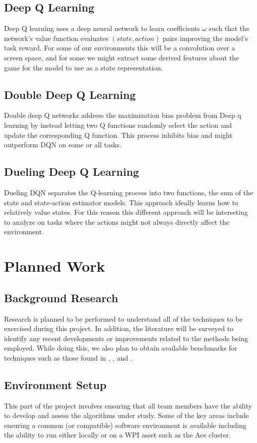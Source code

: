 \documentclass[conference]{IEEEtran}
\begin{document}
\subsection{Deep Q Learning}
Deep Q learning uses a deep neural network to learn coefficients $\omega$ such that the network's value function evaluates $(state, action)$ pairs improving the model's task reward. For some of our environments this will be a convolution over a screen space, and for some we might extract some derived features about the game for the model to use as a state representation.

\subsection{Double Deep Q Learning}
Double deep Q networks address the maximization bias problem from Deep q learning by instead letting two Q functions randomly select the action and update the corresponding Q function. This process inhibits bias and might outperform DQN on some or all tasks.

\subsection{Dueling Deep Q Learning}
Dueling DQN separates the Q-learning process into two functions, the sum of the state and state-action estimator models. This approach ideally learns how to relatively value states. For this reason this different approach will be interseting to analyze on tasks where the actions might not always directly affect the environment.

\section{Planned Work}

\subsection{Background Research}
Research is planned to be performed to understand all of the techniques to be exercised during this project.
In addition, the literature will be surveyed to identify any recent developments or improvements related to the methods being employed.
While doing this, we also plan to obtain available benchmarks for techniques such as those found in \cite{DQNOriginalPaper}, \cite{NatureDeepLearning}, and \cite{bhonker2017playing}.

\subsection{Environment Setup}
This part of the project involves ensuring that all team members have the ability to develop and assess the algorithms under study.
Some of the key areas include ensuring a common (or compatible) software environment is available including the ability to run \cite{bhonker2017playing} either locally or on a WPI asset such as the Ace cluster.
\end{document}
